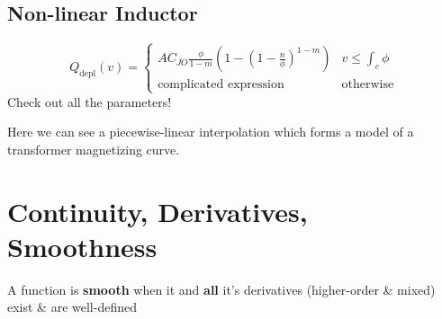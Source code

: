 \documentclass{report}
\begin{document}
\subsection{Non-linear Inductor}
\begin{description}
    \item[]
\end{description}

\begin{example}
    \begin{equation*}
        Q_{\mathrm{depl}}(v) = 
        \begin{cases}
            A C_{JO} \frac{\phi}{1 - m}(1 - (1 - \frac{n}{\phi})^{1 - m}) & v \leq \int_c \phi \\
            \text{complicated expression} & \text{otherwise}
        \end{cases}
    \end{equation*}
    Check out all the parameters!

\end{example}

\begin{example}
    Here we can see a piecewise-linear interpolation which forms a model of a transformer magnetizing curve.
\end{example}

\section{Continuity, Derivatives, Smoothness}


\begin{definition}
    A function is \textbf{smooth} when it and \textbf{all} it's derivatives (higher-order \& mixed) exist \& are well-defined
\end{definition}


\end{document}
